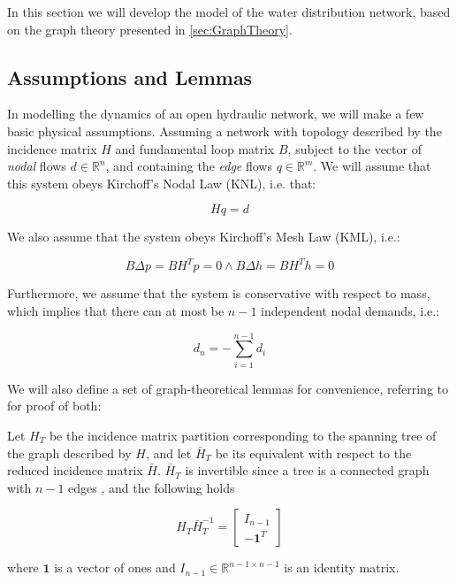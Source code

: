 In this section we will develop the model of the water distribution network, based on the graph theory presented in \cref{sec:GraphTheory}.

\subsection{Assumptions and Lemmas}\label{subsec:AsssumAndLemmas}

In modelling the dynamics of an open hydraulic network, we will make a few basic physical assumptions. Assuming a network with topology described by the incidence matrix $H$ and fundamental loop matrix $B$, subject to the vector of \textit{nodal} flows $d \in \mathbb{R}^n$, and containing the \textit{edge} flows $q \in \mathbb{R}^m$. We will assume that this system obeys Kirchoff's Nodal Law (KNL), i.e. that:

\begin{equation}\label{eq:KirchNodeLaw}
	Hq = d
\end{equation} 

We also assume that the system obeys Kirchoff's Mesh Law (KML), i.e.:

\begin{equation}\label{eq:KirchMeshLaw}
	B\Delta p = B H^T p = 0 \wedge B\Delta h = B H^T h = 0
\end{equation}

Furthermore, we assume that the system is conservative with respect to mass, which implies that there can at most be $n-1$ independent nodal demands, i.e.:

\begin{equation}\label{eq:MassConservation}
	d_n = -\sum_{i=1}^{n-1}d_i
\end{equation}

We will also define a set of graph-theoretical lemmas for convenience, referring to \cite{Jensen} for proof of both:

\begin{lemma}\label{lem:TreePartitionLemma}
	Let $H_T$ be the incidence matrix partition corresponding to the spanning tree of the graph described by $H$, and let $\bar{H}_T$ be its equivalent with respect to the reduced incidence matrix $\bar{H}$. $\bar{H}_T$ is invertible since a tree is a connected graph with $n-1$ edges \cite{Deo}, and the following holds
	
	\begin{equation}\label{eq:TreePartitionLemma}
		H_T\bar{H}_T^{-1} = \begin{bmatrix} I_{n-1} \\ -\mathbf{1}^T	\end{bmatrix}
	\end{equation}

where $\mathbf{1}$ is a vector of ones and $I_{n-1} \in \mathbb{R}^{n-1 \times n-1}$ is an identity matrix.
\end{lemma}

